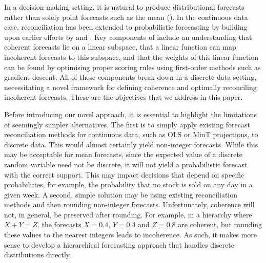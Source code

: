 \documentclass[a4paper,review,12pt,authoryear]{elsarticle}
\theoremstyle{definition}
\begin{document}
In a decision-making setting, it is natural to produce distributional forecasts rather than solely point forecasts such as the mean (\citealp{gneitingProbabilisticForecasting2014}). In the continuous data case, reconciliation has been extended to probabilistic forecasting by \cite{panagiotelisProbabilisticForecastReconciliation2022} building upon earlier efforts by \cite{jeonProbabilisticForecastReconciliation2019} and \cite{bentaiebHierarchicalProbabilisticForecasting2020}. Key components of \cite{panagiotelisProbabilisticForecastReconciliation2022} include an understanding that coherent forecasts lie on a linear subspace, that a linear function can map incoherent forecasts to this subspace, and that the weights of this linear function can be found by optimising proper scoring rules using first-order methods such as gradient descent. All of these components break down in a discrete data setting, necessitating a novel framework for defining coherence and optimally reconciling incoherent forecasts. These are the objectives that we address in this paper.

Before introducing our novel approach, it is essential to highlight the limitations of seemingly simpler alternatives. The first is to simply apply existing forecast reconciliation methods for continuous data, such as OLS or MinT projections, to discrete data. This would almost certainly yield non-integer forecasts. While this may be acceptable for mean forecasts, since the expected value of a discrete random variable need not be discrete, it will not yield a probabilistic forecast with the correct support. This may impact decisions that depend on specific probabilities, for example, the probability that no stock is sold on any day in a given week.  A second, simple solution may be using existing reconciliation methods and then rounding non-integer forecasts. Unfortunately, coherence will not, in general, be preserved after rounding. For example, in a hierarchy where $X+Y=Z$, the forecasts $X=0.4$, $Y=0.4$ and $Z=0.8$ are coherent, but rounding these values to the nearest integers leads to incoherence. As such, it makes more sense to develop a hierarchical forecasting approach that handles discrete distributions directly.
\end{document}
